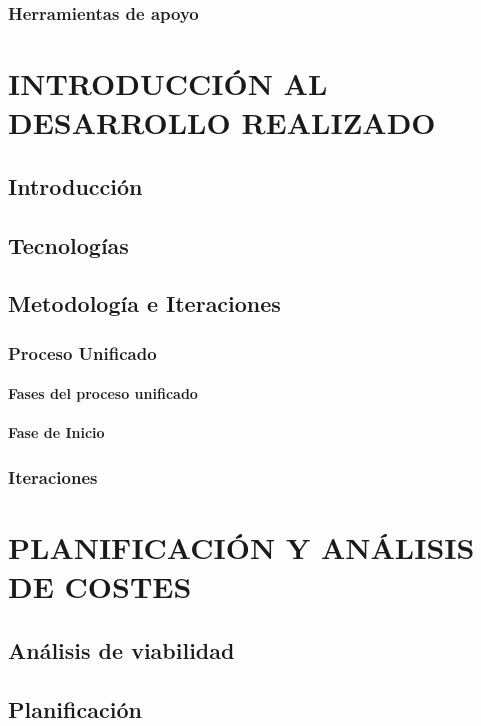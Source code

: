 \documentclass[12pt, a4paper, twoside]{book}
\begin{document}
	\subsection{Herramientas de apoyo}
  
	\chapter{INTRODUCCIÓN AL DESARROLLO REALIZADO}
	\section{Introducción}

	\section{Tecnologías}
		
	\section{Metodología e Iteraciones}

	\subsection{Proceso Unificado}

	\subsubsection{Fases del proceso unificado}
	
	\subsubsection{Fase de Inicio}
	
	\subsection{Iteraciones}

	\chapter{PLANIFICACIÓN Y ANÁLISIS DE COSTES}
	
	\section{Análisis de viabilidad}
	
	\section{Planificación}
\end{document}
